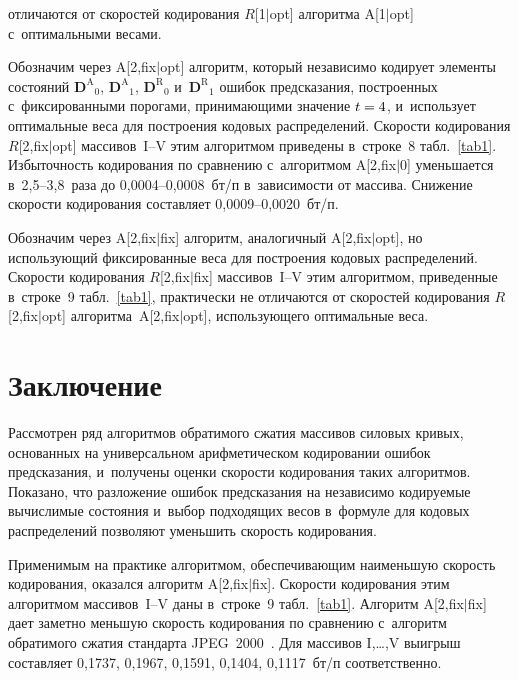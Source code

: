 \begin{multicols}{2}

\vspace*{9pt}


\noindent
 отличаются от скоростей кодирования $R$[1$\vert$opt] алгоритма A[1$\vert$opt] 
с~оптимальными весами.

Обозначим через A[2,fix$\vert$opt] алгоритм, который независимо кодирует элементы состояний
${\mathbf{D}^\text{A}}_0$, ${\mathbf{D}^\text{A}}_1$,
${\mathbf{D}^\text{R}}_0$ и~${\mathbf{D}^\text{R}}_1$
ошибок предсказания, построенных с~фиксированными порогами,  
принимающими значение $t\hm=4$, и~использует оптимальные веса для построения 
кодовых распределений. Скорости кодирования $R$[2,fix$\vert$opt] массивов~I--V 
этим алгоритмом приведены в~строке~8 табл.~\ref{tab1}. Избыточность кодирования по 
сравнению с~алгоритмом A[2,fix$\vert$0] уменьшается в~2,5--3,8~раза до 0,0004--0,0008~бт/п 
в~зависимости от массива. Снижение скорости кодирования составляет 0,0009--0,0020~бт/п.

Обозначим через A[2,fix$\vert$fix] алгоритм, аналогичный A[2,fix$\vert$opt], 
но использующий фиксированные веса для построения кодовых распределений. 
Скорости кодирования $R$[2,fix$\vert$fix] \mbox{массивов~I--V} этим алгоритмом,
 приведенные в~строке~9 табл.~\ref{tab1}, 
практически не отличаются от скоростей кодирования $R$[2,fix$\vert$opt] алгоритма~A[2,fix$\vert$opt], 
использующего оптимальные веса.




\section{Заключение}

Рассмотрен ряд алгоритмов обратимого сжатия массивов силовых кривых, 
основанных на универсальном арифметическом кодировании ошибок предсказания, и~получены 
оценки скорости кодирования таких алгоритмов. Показано, что разложение ошибок 
предсказания на независимо кодируемые вычислимые состояния и~выбор подходящих 
весов в~формуле для кодовых распределений позволяют уменьшить скорость кодирования.

Применимым на практике алгоритмом, обеспечивающим наименьшую скорость кодирования, 
оказался алгоритм A[2,fix$\vert$fix]. Скорости кодирования этим алгоритмом массивов~I--V даны в~строке~9 
табл.~\ref{tab1}. Алгоритм A[2,fix$\vert$fix] дает заметно меньшую скорость
 кодирования по сравнению с~алгоритм обратимого сжатия стандарта JPEG~2000~\cite{b1}. 
 Для массивов I,\dots,V выигрыш составляет 0,1737, 0,1967, 0,1591, 0,1404, 0,1117~бт/п со\-от\-вет\-ст\-венно.
 {
 
}
\end{multicols}
